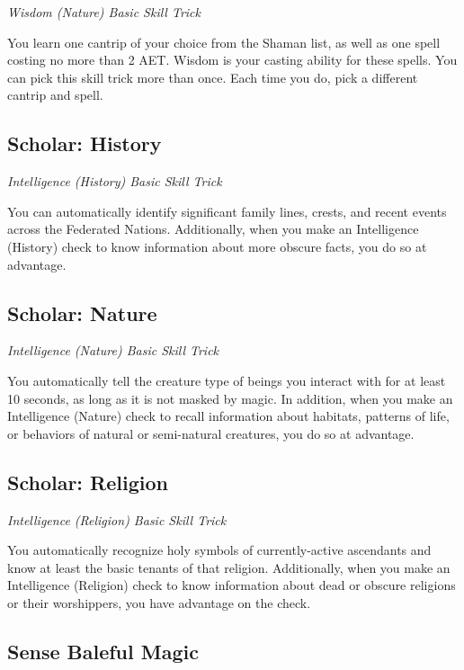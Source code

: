 \textit{Wisdom (Nature) Basic Skill Trick}

You learn one cantrip of your choice from the Shaman list, as well as one spell costing no more than 2 AET. Wisdom is your casting ability for these spells. You can pick this skill trick more than once. Each time you do, pick a different cantrip and spell.

\subsection{Scholar: History}\label{st:scholar-history}

\textit{Intelligence (History) Basic Skill Trick}

You can automatically identify significant family lines, crests, and recent events across the Federated Nations. Additionally, when you make an Intelligence (History) check to know information about more obscure facts, you do so at advantage.

\subsection{Scholar: Nature}

\textit{Intelligence (Nature) Basic Skill Trick}

You automatically tell the creature type of beings you interact with for at least 10 seconds, as long as it is not masked by magic. In addition, when you make an Intelligence (Nature) check to recall information about habitats, patterns of life, or behaviors of natural or semi-natural creatures, you do so at advantage.

\subsection{Scholar: Religion}\label{st:scholar-religion}

\textit{Intelligence (Religion) Basic Skill Trick}

You automatically recognize holy symbols of currently-active ascendants and know at least the basic tenants of that religion. Additionally, when you make an Intelligence (Religion) check to know information about dead or obscure religions or their worshippers, you have advantage on the check.

\subsection{Sense Baleful Magic}\label{st:sense-baleful-magic}

